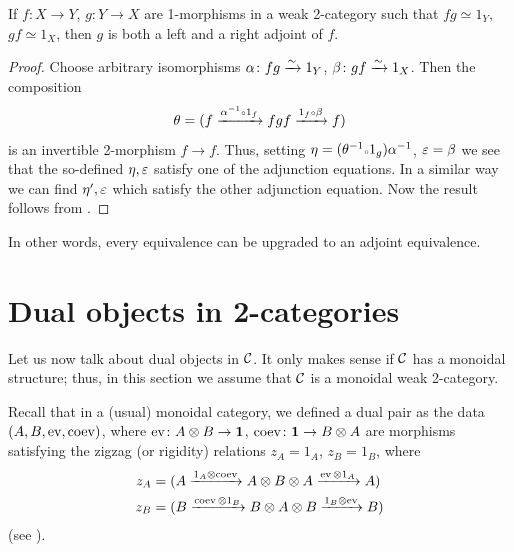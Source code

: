 \begin{lemma}\label{l:adjoint-equivalence}
  If $f\colon X\to Y$, $g\colon Y\to X$ are 1-morphisms in a weak
  2-category such that $fg\simeq 1_Y$, $gf\simeq 1_X$, then
  $g$ is both a left and a right adjoint of $f$.
\end{lemma}
\begin{proof}
  Choose arbitrary isomorphisms $\alpha\colon fg\xrightarrow{\sim} 1_Y$, $\beta \colon gf\xrightarrow{\sim}
  1_X$. Then the composition
  $$
  \theta = (f\xrightarrow{ \alpha^{-1} \text{\tiny $\circ$} 1_f} fgf\xrightarrow{1_f\text{\tiny $\circ$} \beta} f)
  $$
  is an invertible 2-morphism $f\to f$. Thus, setting $\eta = (\theta^{-1}\text{\tiny $\circ$}
  1_g) \alpha^{-1}$, $\varepsilon = \beta$ we see that the so-defined $\eta, \varepsilon$ satisfy one
  of the adjunction equations. In a similar way we can find $\eta', \varepsilon$ which
  satisfy the other adjunction equation. Now the result follows from
  .
\end{proof}
In other words, every equivalence can be upgraded to an adjoint equivalence.



%
%

\section{Dual objects in 2-categories}\label{s:coherent-dual-pair}

Let us now talk about dual objects in $\mathcal{C}$. It only makes sense
if $\mathcal{C}$ has a monoidal structure; thus, in this section we assume that
$\mathcal{C}$ is a monoidal weak 2-category.

Recall that in a (usual) monoidal category, we defined a dual pair as the data
$(A,B, \operatorname{ev}, \operatorname{coev})$, where $\operatorname{ev}\colon A\otimes B\to \mathbf{1}$,
$\operatorname{coev} \colon \mathbf{1} \to B\otimes A$ are morphisms satisfying the zigzag (or
rigidity) relations $z_A= 1_A$, $z_B = 1_B$, where
\begin{equation}\label{e:zigzags}
    \begin{aligned}
        z_A&= (A\xrightarrow{1_A\otimes \operatorname{coev}} A\otimes B \otimes A \xrightarrow{\operatorname{ev}\otimes
        1_A} A)\\
        z_B &= (B \xrightarrow{\operatorname{coev} \otimes 1_B} B\otimes A \otimes B
        \xrightarrow{1_B\otimes\operatorname{ev}} B)
\end{aligned}
\end{equation}
(see ).

